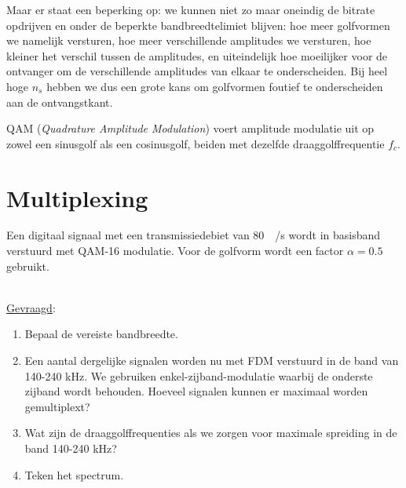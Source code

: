 \documentclass{kuburgiearticle}
\begin{document}
\begin{enumerate}
		Maar er staat een beperking op: we kunnen niet zo maar oneindig de bitrate opdrijven en onder de beperkte bandbreedtelimiet blijven: hoe meer golfvormen we namelijk versturen, hoe meer verschillende amplitudes we versturen, hoe kleiner het verschil tussen de amplitudes, en uiteindelijk hoe moeilijker voor de ontvanger om de verschillende amplitudes van elkaar te onderscheiden. Bij heel hoge \(n_s\) hebben we dus een grote kans om golfvormen foutief te onderscheiden aan de ontvangstkant.

		QAM (\textit{Quadrature Amplitude Modulation}) voert amplitude modulatie uit op zowel een sinusgolf als een cosinusgolf, beiden met dezelfde draaggolffrequentie \(f_c\).

	\end{enumerate}

	\newpage
	\section{Multiplexing}

	Een digitaal signaal met een transmissiedebiet van \SI{80}{\kilo\bit/\second} wordt in basisband verstuurd met
	QAM-16 modulatie. Voor de golfvorm wordt een factor \(\alpha = 0.5\) gebruikt.

	\hfill \\
	\underline{Gevraagd}:
	\begin{enumerate}
		\item Bepaal de vereiste bandbreedte.
		\item Een aantal dergelijke signalen worden nu met FDM verstuurd in de band van 140-240 kHz. We gebruiken enkel-zijband-modulatie waarbij de onderste zijband wordt behouden. Hoeveel signalen kunnen er maximaal worden gemultiplext?
		\item Wat zijn de draaggolffrequenties als we zorgen voor maximale spreiding in de band 140-240 kHz?
		\item Teken het spectrum.
	\end{enumerate}
\end{document}
